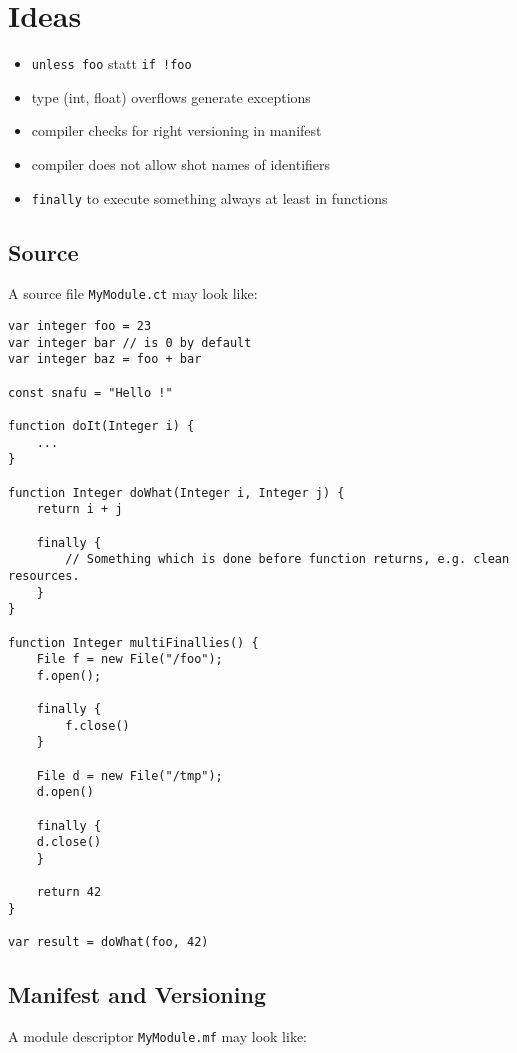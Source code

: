 \documentclass[a4paper,12pt]{article}
\begin{document}
\section{Ideas}

\begin{itemize}
	\item \verb|unless foo| statt \verb|if !foo|
	\item type (int, float) overflows generate exceptions
	\item compiler checks for right versioning in manifest
	\item compiler does not allow shot names of identifiers
	\item \verb|finally| to execute something always at least in functions
\end{itemize}

\subsection{Source}

A source file \verb|MyModule.ct| may look like:

\begin{verbatim}
var integer foo = 23
var integer bar // is 0 by default
var integer baz = foo + bar

const snafu = "Hello !"

function doIt(Integer i) {
    ...
}

function Integer doWhat(Integer i, Integer j) {
    return i + j
    
    finally {
    	// Something which is done before function returns, e.g. clean resources.
    }
}

function Integer multiFinallies() {
    File f = new File("/foo");
    f.open();
    
    finally {
        f.close()
    }
    
    File d = new File("/tmp");
    d.open()
    
    finally {
    d.close()
    }
    
    return 42
}

var result = doWhat(foo, 42)	
\end{verbatim}

\subsection{Manifest and Versioning}

A module descriptor \verb|MyModule.mf| may look like:
\end{document}
